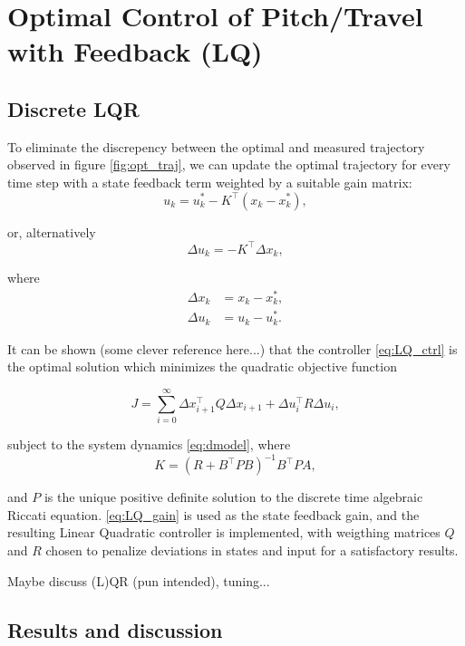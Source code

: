 \section{Optimal Control of Pitch/Travel with Feedback (LQ)}\label{sec:prob3}

\subsection{Discrete LQR}

To eliminate the discrepency between the optimal and measured trajectory observed in figure \ref{fig:opt_traj}, we can update the optimal trajectory for every time step with a state feedback term weighted by a suitable gain matrix:
\begin{equation*}
u_k = u_k^* - K^\top(x_k - x_k^*),
\end{equation*}

or, alternatively
\begin{equation}
\label{eq:LQ_ctrl}
\Delta u_k = - K^\top \Delta x_k,
\end{equation}

where 
\begin{align*}
\Delta x_k &= x_k - x_k^*,\\
\Delta u_k &= u_k - u_k^*.
\end{align*}

It can be shown (some clever reference here...) that the controller \eqref{eq:LQ_ctrl} is the optimal solution which minimizes the quadratic objective function

\begin{equation*}
	J = \sum_{i=0}^{\infty} \Delta x_{i+1}^\top Q \Delta x_{i+1} + \Delta u_i^\top R \Delta u_i,
\end{equation*}

subject to the system dynamics \eqref{eq:dmodel}, where
\begin{equation}
\label{eq:LQ_gain}
	K = (R + B^\top P B)^{-1} B^\top P A,
\end{equation}

and $P$ is the unique positive definite solution to the discrete time algebraic Riccati equation. \eqref{eq:LQ_gain} is used as the state feedback gain, and the resulting Linear Quadratic controller is implemented, with weigthing matrices $Q$ and $R$ chosen to penalize deviations in states and input for a satisfactory results.

Maybe discuss (L)QR (pun intended), tuning...


\subsection{Results and discussion}

